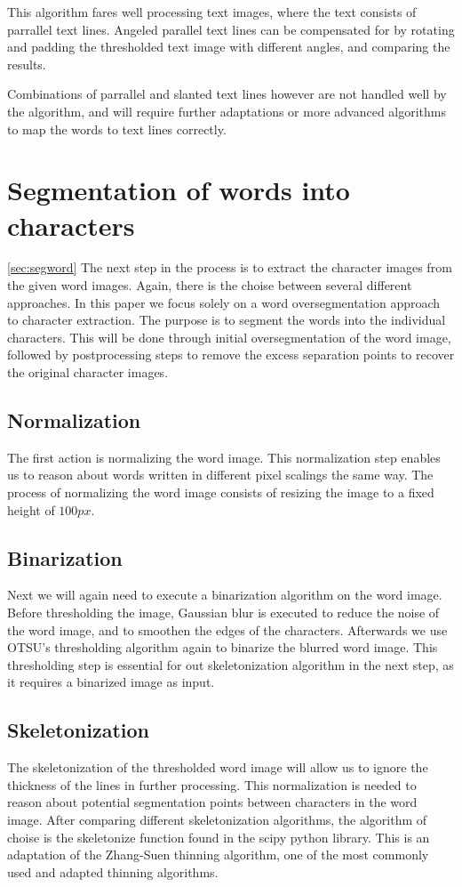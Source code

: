 \documentclass{article}
\begin{document}
This algorithm fares well processing text images, where the text consists of parrallel text lines.
Angeled parallel text lines can be compensated for by rotating and padding the thresholded text image with different angles, and comparing the results.

Combinations of parrallel and slanted text lines however are not handled well by the algorithm, and will require further adaptations or more advanced algorithms to map the words to text lines correctly.


\section{Segmentation of words into characters}
\ref{sec:segword}
The next step in the process is to extract the character images from the given word images.
Again, there is the choise between several different approaches.
In this paper we focus solely on a word oversegmentation approach to character extraction.
The purpose is to segment the words into the individual characters.
This will be done through initial oversegmentation of the word image, followed by postprocessing steps to remove the excess separation points to recover the original character images.

\subsection{Normalization} %
The first action is normalizing the word image.
This normalization step enables us to reason about words written in different pixel scalings the same way.
The process of normalizing the word image consists of resizing the image to a fixed height of $100px$.

\subsection{Binarization}
Next we will again need to execute a binarization algorithm on the word image.
Before thresholding the image, Gaussian blur is executed to reduce the noise of the word image, and to smoothen the edges of the characters.
Afterwards we use OTSU's thresholding algorithm again to binarize the blurred word image.
This thresholding step is essential for out skeletonization algorithm in the next step, as it requires a binarized image as input.

\subsection{Skeletonization}
The skeletonization of the thresholded word image will allow us to ignore the thickness of the lines in further processing. 
This normalization is needed to reason about potential segmentation points between characters in the word image.
After comparing different skeletonization algorithms, the algorithm of choise is the skeletonize function found in the scipy python library.
This is an adaptation of the Zhang-Suen thinning algorithm, one of the most commonly used and adapted thinning algorithms.
\cite{zsthinning}
\end{document}
